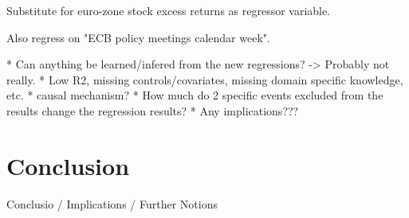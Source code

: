 Substitute for euro-zone stock excess returns as regressor variable.

Also regress on "ECB policy meetings calendar week". 

* Can anything be learned/infered from the new regressions? -> Probably not really.
* Low R2, missing controls/covariates, missing domain specific knowledge, etc.
* causal mechanism?
* How much do 2 specific events excluded from the results change the regression results?
* Any implications???


\chapter{Conclusion}

Conclusio / Implications / Further Notions


